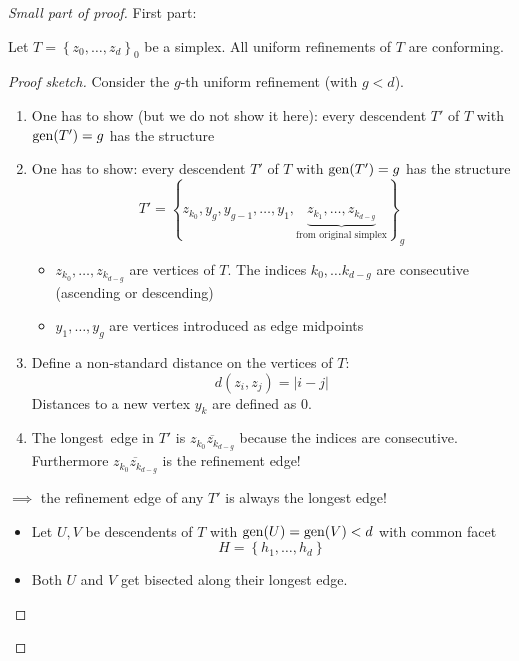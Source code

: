 \begin{proof}[Small part of proof]
	First part:
	\begin{lemma}
		Let $T = \left\{ z_{0},\dots ,z_{d} \right\}_{0}$ be a simplex. All uniform refinements of $T$ are conforming.
	\end{lemma}
  \begin{proof}[Proof sketch]
    Consider the $g$-th uniform refinement (with $g < d$).
		\begin{enumerate}
      \item One has to show (but we do not show it here): every descendent $T'$ of $T$ with $\operatorname{gen}(T')=g$ has the structure
			\item One has to show: every descendent $T'$ of $T$ with $\operatorname{gen}(T')=g$ has the structure
				\begin{equation*}
					T' = \left\{ z_{k_{0}},y_{g},y_{g-1},\dots ,y_{1},\underbrace{z_{k_{1}},\dots, z_{k_{d-g}} }_{\text{from original simplex}} \right\}_{g}
				\end{equation*}
				\begin{itemize}
					\item $z_{k_{0}}, \dots ,z_{k_{d-g}}$ are vertices of $T$. The indices $k_{0},\dots k_{d-g}$ are consecutive (ascending or descending)
					\item $y_{1},\dots ,y_{g}$ are vertices introduced as edge midpoints
				\end{itemize}
			\item Define a non-standard distance on the vertices of $T$:
				\begin{equation*}
					d(z_{i},z_{j}) = |i-j|
				\end{equation*}
				Distances to a new vertex $y_{k}$ are defined as $0$.
			\item The \glqq longest\grqq\ edge in $T'$ is $\overline{z_{k_{0}}z_{k_{d-g}}}$ because the indices are consecutive.
				Furthermore $\overline{z_{k_{0}}z_{k_{d-g}}}$ is the refinement edge!
		\end{enumerate}
    $\implies$ the refinement edge of any $T'$ is always the \glqq longest\grqq{} edge!
		\begin{itemize}
			\item Let $U,V$ be descendents of $T$ with $\operatorname{gen}(U)=\operatorname{gen}(V)< d$ with common facet 
				\begin{equation*}
					H = \left\{ h_{1},\dots ,h_{d} \right\}	
				\end{equation*}
				 
			\item Both $U$ and $V$ get bisected along their longest edge.

\end{itemize}
\end{proof}
\end{proof}
